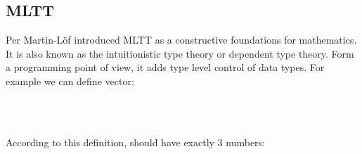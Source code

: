 \subsection*{MLTT}

Per Martin-L\"{o}f introduced MLTT as a constructive foundations for mathematics. It is also known as the intuitionistic type theory or dependent type theory. Form a programming point of view, it adds type level control of data types. For example we can define vector:

\begin{code}%
\>[0]\AgdaSpace{}%
\AgdaSpace{}%
\AgdaSymbol{(}\AgdaSpace{}%
\AgdaSymbol{:}\AgdaSpace{}%
\AgdaSymbol{)}\AgdaSpace{}%
\AgdaSymbol{:}\AgdaSpace{}%
\AgdaSpace{}%
\AgdaSpace{}%
\AgdaSpace{}%
\<%
\\
\>[0][@{}l@{\AgdaIndent{0}}]%
\>[2]\AgdaInductiveConstructor{[]}\AgdaSpace{}%
\AgdaSymbol{:}\AgdaSpace{}%
\AgdaSpace{}%
\AgdaSpace{}%
\<%
\\
%
\>[2]\AgdaSpace{}%
\AgdaSymbol{:}\AgdaSpace{}%
\AgdaSymbol{\{}\AgdaSpace{}%
\AgdaSymbol{:}\AgdaSpace{}%
\AgdaSymbol{\}}\AgdaSpace{}%
\AgdaSpace{}%
\AgdaSpace{}%
\AgdaSpace{}%
\AgdaSpace{}%
\AgdaSpace{}%
\AgdaSpace{}%
\AgdaSpace{}%
\AgdaSpace{}%
\AgdaSpace{}%
\AgdaSymbol{(}\AgdaSpace{}%
\AgdaSymbol{)}\<%
\end{code}

According to this definition,    should have exactly 3 numbers:

\begin{code}%
\>[0]\AgdaSpace{}%
\AgdaSymbol{:}\AgdaSpace{}%
\AgdaSpace{}%
\AgdaSpace{}%
\<%
\\
\>[0]\AgdaSpace{}%
\AgdaSymbol{=}\AgdaSpace{}%
\AgdaSpace{}%
\AgdaSpace{}%
\AgdaSpace{}%
\AgdaSpace{}%
\AgdaSpace{}%
\AgdaSpace{}%
\AgdaInductiveConstructor{[]}\<%
\end{code}

